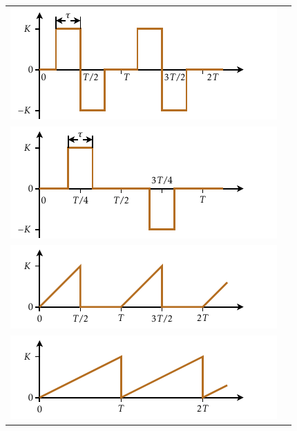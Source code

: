 \begin{longtable}{cc}
   \includegraphics{Imatges/Cap-Fourier-Funcio-4.pdf} & \raisebox{1.2cm}{$\displaystyle\frac{{2K}}{\piup }\sum\limits_{n = 1}^\infty  {\frac{{( - 1)^n (\cos (n\omega \tau )-1)\sin (n\omega t)}}{n}}$} \\[2.4ex]
   \includegraphics{Imatges/Cap-Fourier-Funcio-5.pdf} & \raisebox{1.2cm}{$\displaystyle\frac{{4K}}{{\piup }}\sum\limits_{n = 1}^\infty  {\frac{{ (-1)^{n+1}\sin \left(\dfrac{{(2n-1)\omega \tau }}{2}\right)\sin \big((2n-1)\omega t\big)}}{2n-1}}$} \\[2.4ex]
   \includegraphics{Imatges/Cap-Fourier-Funcio-6.pdf} &\raisebox{1cm}{$\begin{array}{*{20}r}
   {\displaystyle\frac{K}{4} - \frac{{2K}}{{\piup ^2 }}\sum\limits_{n = 1}^\infty  {\frac{{\cos \big((2n - 1)\omega t\big)}}{{(2n - 1)^2 }} + } }\\[2.4ex]
   {\displaystyle + \frac{K}{\piup }\sum\limits_{n = 1}^\infty  {\frac{{( - 1)^{n + 1} \sin (n\omega t)}}{n}} }  \\
    \end{array}$}\\[2.4ex]
   \includegraphics{Imatges/Cap-Fourier-Funcio-7.pdf} & \raisebox{0.8cm}{$\displaystyle\frac{K}{2} - \frac{K}{\piup }\sum\limits_{n = 1}^\infty  {\frac{{\sin (n\omega t)}}{n}}$}\\[2.4ex]

\end{longtable}
